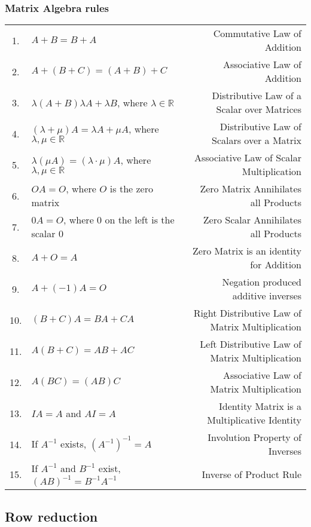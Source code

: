 \subsubsection{Matrix Algebra rules}
\begin{center}
    \begin{tabular}{ c | l | r }
        1. & $A+B=B+A$ & Commutative Law of Addition \\
        2. & $ A+(B+C) = (A+B)+C $ & Associative Law of Addition \\
        3. & $ \lambda(A+B) \lambda A + \lambda B $, where $ \lambda \in \mathbb{R} $ & Distributive Law of a Scalar over Matrices \\
        4. & $ (\lambda + \mu)A = \lambda A + \mu A  $, where $ \lambda,\mu \in \mathbb{R} $& Distributive Law of Scalars over a Matrix \\
        5. & $ \lambda(\mu A) = (\lambda \cdot \mu)A $, where $ \lambda,\mu \in \mathbb{R} $ & Associative Law of Scalar Multiplication \\
        6. & $ OA = O $, where $O$ is the zero matrix & Zero Matrix Annihilates all Products \\
        7. & $ 0A = O $, where $0$ on the left is the scalar $0$ & Zero Scalar Annihilates all Products \\
        8. & $ A + O = A $ & Zero Matrix is an identity for Addition \\
        9. & $ A + (-1)A = O $ & Negation produced additive inverses \\
        10. & $ (B+C)A=BA+CA $ & Right Distributive Law of Matrix Multiplication \\
        11. & $ A(B+C)=AB+AC $ & Left Distributive Law of Matrix Multiplication \\
        12. & $ A(BC)=(AB)C $ & Associative Law of Matrix Multiplication \\
        13. & $ IA=A $ and $ AI = A $ & Identity Matrix is a Multiplicative Identity \\
        14. & If $ A^{-1} $ exists, $ (A^{-1})^{-1} = A $ & Involution Property of Inverses \\
        15. & If $ A^{-1} \text{ and } B^{-1} $ exist, $ (AB)^{-1} = B^{-1}A^{-1} $ & Inverse of Product Rule \\
    \end{tabular}
\end{center}

\subsection{Row reduction}

